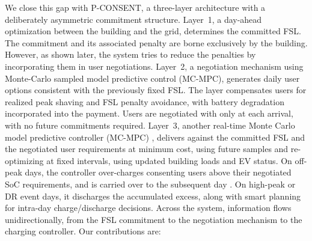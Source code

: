 We close this gap with P-CONSENT, a three-layer architecture with a deliberately asymmetric commitment structure. 
Layer~1, a day-ahead optimization between the building and the grid, determines the committed FSL. The commitment and its associated penalty are borne exclusively by the building. However, as shown later, the system tries to reduce the penalties by incorporating them in user negotiations. 
Layer~2, a negotiation mechanism using Monte-Carlo sampled model predictive control (MC-MPC), generates daily user options consistent with the previously fixed FSL. The layer compensates users for realized peak shaving and FSL penalty avoidance, with battery degradation incorporated into the payment. Users are negotiated with only at each arrival, with no future commitments required. 
Layer~3, another real-time Monte Carlo model predictive controller (MC-MPC) \cite{iccps2026_pv2b}, delivers against the committed FSL and the negotiated user requirements at minimum cost, using future samples and re-optimizing at fixed intervals, using updated building loads and EV status. On off-peak days, the controller over-charges consenting users above their negotiated SoC requirements, and is carried over to the subsequent day \cite{iccps2026_pv2b}. On high-peak or DR event days, it discharges the accumulated excess, along with smart planning for intra-day charge/discharge decisions.
Across the system, information flows unidirectionally, from the FSL commitment to the negotiation mechanism to the charging controller.
Our contributions are: 

